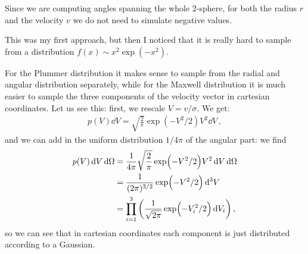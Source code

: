 \documentclass[main.tex]{subfiles}
\begin{document}
Since we are computing angles spanning the whole \(2\)-sphere, for both the radius \(r\) and the velocity \(v\) we do not need to simulate negative values.

This was my first approach, but then I noticed that it is really hard to sample from a distribution \(f(x) \sim x^2 \exp(-x^2)\). 

For the Plummer distribution it makes sense to sample from the radial and angular distribution separately, while for the Maxwell distribution it is much easier to sample the three components of the velocity vector in cartesian coordinates. Let us see this: first, we rescale \(V = v/\sigma \). We get: 
%
\begin{align}
  p(V) \dd{V} = \sqrt{\frac{2}{\pi }} \exp(- V^2/2)V^2 \dd{V}
\,,
\end{align}
%
and we can add in the uniform distribution \(1/ 4\pi \) of the angular part: we find 
%
\begin{align}
p(V) \dd{V} \dd{\Omega } &= \frac{1}{4 \pi } \sqrt{\frac{2}{\pi }} \exp(-V^2/2) V^2 \dd{V} \dd{\Omega }  \\
&= \frac{1}{(2 \pi )^{3/2}} \exp(-V^2/2) \dd[3]{V}  \\
&= \prod_{i=1}^{3} \qty(\frac{1}{\sqrt{2 \pi }} \exp(-V_i^2/2) \dd{V_i})
\,,
\end{align}
%
so we can see that in cartesian coordinates each component is just distributed according to a Gaussian. 
\end{document}
